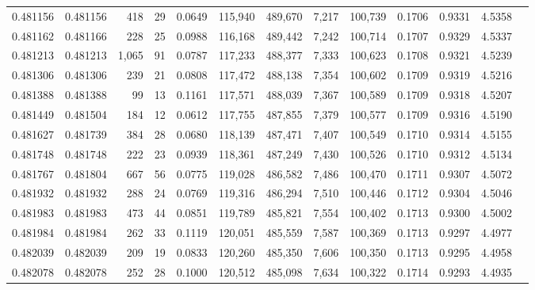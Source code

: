 \begin{tabular}{rrrrrrrrrrrrr}
0.481156 & 0.481156 &   418 &    29 &                                     0.0649 & 115,940 & 489,670 &   7,217 & 100,739 & 0.1706 & 0.9331 & 4.5358 \\
0.481162 & 0.481166 &   228 &    25 &                                     0.0988 & 116,168 & 489,442 &   7,242 & 100,714 & 0.1707 & 0.9329 & 4.5337 \\
0.481213 & 0.481213 & 1,065 &    91 &                                     0.0787 & 117,233 & 488,377 &   7,333 & 100,623 & 0.1708 & 0.9321 & 4.5239 \\
0.481306 & 0.481306 &   239 &    21 &                                     0.0808 & 117,472 & 488,138 &   7,354 & 100,602 & 0.1709 & 0.9319 & 4.5216 \\
0.481388 & 0.481388 &    99 &    13 &                                     0.1161 & 117,571 & 488,039 &   7,367 & 100,589 & 0.1709 & 0.9318 & 4.5207 \\
0.481449 & 0.481504 &   184 &    12 &                                     0.0612 & 117,755 & 487,855 &   7,379 & 100,577 & 0.1709 & 0.9316 & 4.5190 \\
0.481627 & 0.481739 &   384 &    28 &                                     0.0680 & 118,139 & 487,471 &   7,407 & 100,549 & 0.1710 & 0.9314 & 4.5155 \\
0.481748 & 0.481748 &   222 &    23 &                                     0.0939 & 118,361 & 487,249 &   7,430 & 100,526 & 0.1710 & 0.9312 & 4.5134 \\
0.481767 & 0.481804 &   667 &    56 &                                     0.0775 & 119,028 & 486,582 &   7,486 & 100,470 & 0.1711 & 0.9307 & 4.5072 \\
0.481932 & 0.481932 &   288 &    24 &                                     0.0769 & 119,316 & 486,294 &   7,510 & 100,446 & 0.1712 & 0.9304 & 4.5046 \\
0.481983 & 0.481983 &   473 &    44 &                                     0.0851 & 119,789 & 485,821 &   7,554 & 100,402 & 0.1713 & 0.9300 & 4.5002 \\
0.481984 & 0.481984 &   262 &    33 &                                     0.1119 & 120,051 & 485,559 &   7,587 & 100,369 & 0.1713 & 0.9297 & 4.4977 \\
0.482039 & 0.482039 &   209 &    19 &                                     0.0833 & 120,260 & 485,350 &   7,606 & 100,350 & 0.1713 & 0.9295 & 4.4958 \\
0.482078 & 0.482078 &   252 &    28 &                                     0.1000 & 120,512 & 485,098 &   7,634 & 100,322 & 0.1714 & 0.9293 & 4.4935 \\

\end{tabular}
